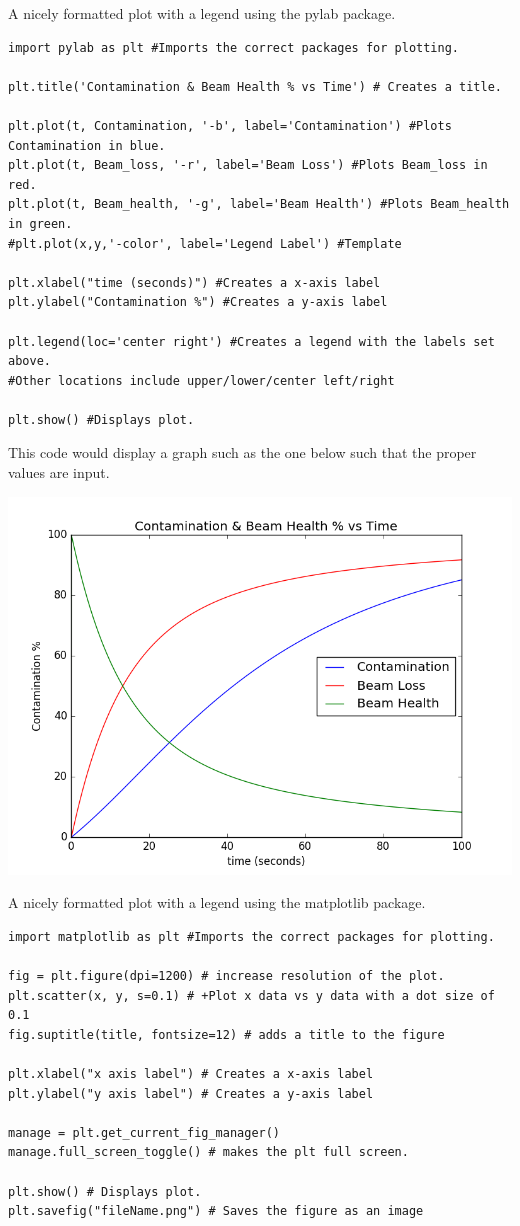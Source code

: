 A nicely formatted plot with a legend using the pylab package.
\begin{lstlisting}
import pylab as plt #Imports the correct packages for plotting.

plt.title('Contamination & Beam Health % vs Time') # Creates a title.

plt.plot(t, Contamination, '-b', label='Contamination') #Plots Contamination in blue.
plt.plot(t, Beam_loss, '-r', label='Beam Loss') #Plots Beam_loss in red.
plt.plot(t, Beam_health, '-g', label='Beam Health') #Plots Beam_health in green.
#plt.plot(x,y,'-color', label='Legend Label') #Template

plt.xlabel("time (seconds)") #Creates a x-axis label
plt.ylabel("Contamination %") #Creates a y-axis label

plt.legend(loc='center right') #Creates a legend with the labels set above.
#Other locations include upper/lower/center left/right

plt.show() #Displays plot.
\end{lstlisting}
This code would display a graph such as the one below such that the proper values are input.

\includegraphics[width=0.5\linewidth]{./Images/Figures/figure_1-4}


A nicely formatted plot with a legend using the matplotlib package.
\begin{lstlisting}
import matplotlib as plt #Imports the correct packages for plotting.

fig = plt.figure(dpi=1200) # increase resolution of the plot.
plt.scatter(x, y, s=0.1) # +Plot x data vs y data with a dot size of 0.1
fig.suptitle(title, fontsize=12) # adds a title to the figure

plt.xlabel("x axis label") # Creates a x-axis label
plt.ylabel("y axis label") # Creates a y-axis label

manage = plt.get_current_fig_manager()
manage.full_screen_toggle() # makes the plt full screen.

plt.show() # Displays plot.
plt.savefig("fileName.png") # Saves the figure as an image
\end{lstlisting}

